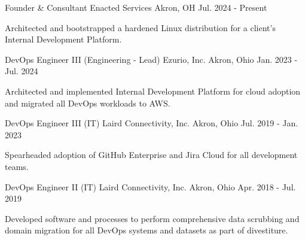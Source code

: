 

\begin{cventries}

  \cventry
    {Founder \& Consultant} %
    {Enacted Services} %
    {Akron, OH} %
    {Jul. 2024 - Present} %
    {
      \begin{cvitems} %
        \item {Architected and bootstrapped a hardened Linux distribution for a client's Internal Development Platform.}
      \end{cvitems}
    }

  \cventry
    {DevOps Engineer III (Engineering - Lead)} %
    {Ezurio, Inc.} %
    {Akron, Ohio} %
    {Jan. 2023 - Jul. 2024} %
    {
      \begin{cvitems} %
        \item {Architected and implemented Internal Development Platform for cloud adoption and migrated all DevOps workloads to AWS.}
      \end{cvitems}
    }

  \cventry
    {DevOps Engineer III (IT)} %
    {Laird Connectivity, Inc.} %
    {Akron, Ohio} %
    {Jul. 2019 - Jan. 2023} %
    {
      \begin{cvitems} %
        \item {Spearheaded adoption of GitHub Enterprise and Jira Cloud for all development teams.}
      \end{cvitems}
    }

  \cventry
    {DevOps Engineer II (IT)} %
    {Laird Connectivity, Inc.} %
    {Akron, Ohio} %
    {Apr. 2018 - Jul. 2019} %
    {
      \begin{cvitems} %
        \item {Developed software and processes to perform comprehensive data scrubbing and domain migration for all DevOps systems and datasets as part of divestiture.}
      \end{cvitems}
    }


\end{cventries}
